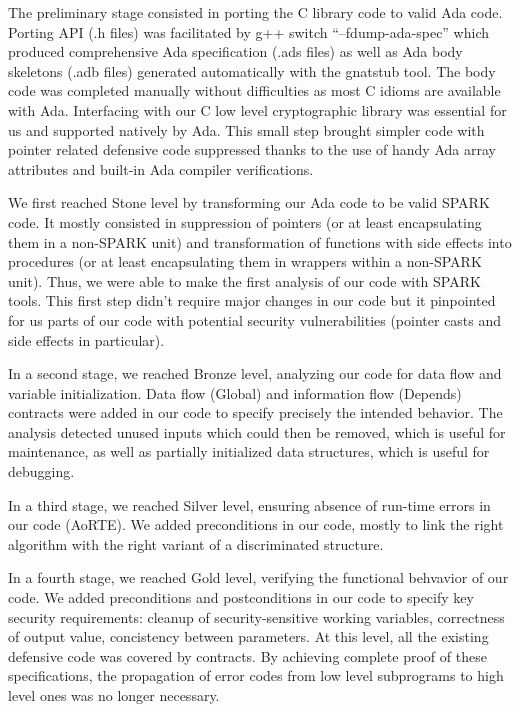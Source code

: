 \documentclass{llncs}
\begin{document}
The preliminary stage consisted in porting the C library code to valid Ada
code. Porting API (.h files) was facilitated by g++ switch ``–fdump-ada-spec''
which produced comprehensive Ada specification (.ads files) as well as Ada body
skeletons (.adb files) generated automatically with the gnatstub tool. The body
code was completed manually without difficulties as most C idioms are available
with Ada. Interfacing with our C low level cryptographic library was essential
for us and supported natively by Ada. This small step brought simpler code with
pointer related defensive code suppressed thanks to the use of handy Ada array
attributes and built-in Ada compiler verifications.

We first reached Stone level by transforming our Ada code to be valid SPARK
code. It mostly consisted in suppression of pointers (or at least encapsulating
them in a non-SPARK unit) and transformation of functions with side effects
into procedures (or at least encapsulating them in wrappers within a non-SPARK
unit). Thus, we were able to make the first analysis of our code with SPARK
tools. This first step didn't require major changes in our code but it
pinpointed for us parts of our code with potential security vulnerabilities
(pointer casts and side effects in particular).

In a second stage, we reached Bronze level, analyzing our code for data flow
and variable initialization. Data flow (Global) and information flow (Depends)
contracts were added in our code to specify precisely the intended
behavior. The analysis detected unused inputs which could then be removed,
which is useful for maintenance, as well as partially initialized data
structures, which is useful for debugging.

In a third stage, we reached Silver level, ensuring absence of run-time errors
in our code (AoRTE). We added preconditions in our code, mostly to link the
right algorithm with the right variant of a discriminated structure.

In a fourth stage, we reached Gold level, verifying the functional behvavior of
our code.  We added preconditions and postconditions in our code to specify key
security requirements: cleanup of security-sensitive working variables,
correctness of output value, concistency between parameters. At this level, all
the existing defensive code was covered by contracts. By achieving complete
proof of these specifications, the propagation of error codes from low level
subprograms to high level ones was no longer necessary.
\end{document}
